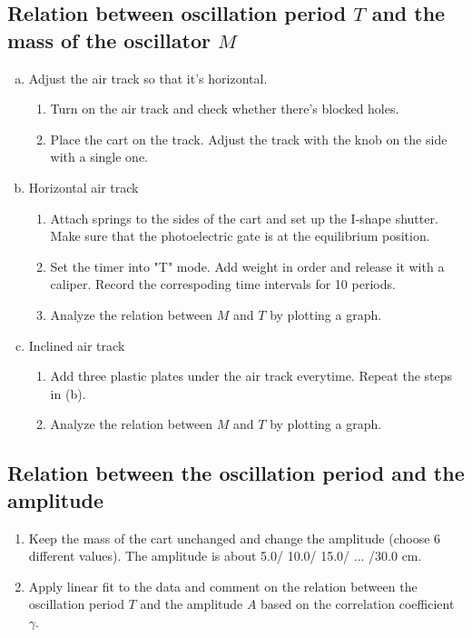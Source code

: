 \subsection{Relation between oscillation period $T$ and the mass of the oscillator $M$}
    \begin{enumerate}[(a)]
        \item Adjust the air track so that it's horizontal.
            \begin{enumerate}[1.]
                \item Turn on the air track and check whether there's blocked holes.
                \item Place the cart on the track. Adjust the track with the knob on the side with a single one.
            \end{enumerate}
        \item Horizontal air track
            \begin{enumerate}[1.]
                \item Attach springs to the sides of the cart and set up the I-shape shutter. Make sure that the photoelectric gate is at the equilibrium position.
                \item Set the timer into "T" mode. Add weight in order and release it with a caliper. Record the correspoding time intervals for 10 periods.
                \item Analyze the relation between $M$ and $T$ by plotting a graph.
            \end{enumerate}
        \item Inclined air track
            \begin{enumerate}[1.]
                \item Add three plastic plates under the air track everytime. Repeat the steps in (b).
                \item Analyze the relation between $M$ and $T$ by plotting a graph.
            \end{enumerate}
    \end{enumerate}
\subsection{Relation between the oscillation period and the amplitude}
    \begin{enumerate}
        \item Keep the mass of the cart unchanged and change the amplitude (choose 6 different values). The amplitude is about 5.0/ 10.0/ 15.0/ ... /30.0 cm.
        \item Apply linear fit to the data and comment on the relation between the oscillation period $T$ and the amplitude $A$ based on the correlation coefficient $\gamma$.
    \end{enumerate}
